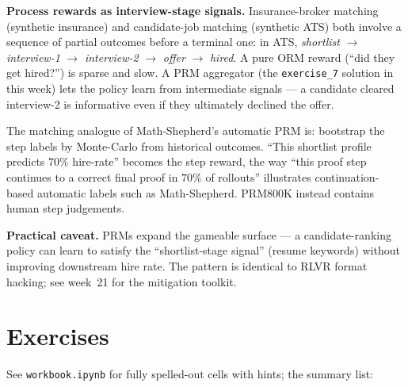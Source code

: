 \documentclass[11pt,oneside]{scrbook}
\begin{document}
\begin{matching}
\textbf{Process rewards as interview-stage signals.}
Insurance-broker matching (synthetic insurance) and candidate-job matching (synthetic ATS)
both involve a sequence of partial outcomes before a terminal one: in ATS,
\textsl{shortlist} $\to$ \textsl{interview-1} $\to$ \textsl{interview-2}
$\to$ \textsl{offer} $\to$ \textsl{hired}. A pure ORM reward (``did they
get hired?'') is sparse and slow. A PRM aggregator (the
\texttt{exercise\_7} solution in this week) lets the policy learn from
intermediate signals --- a candidate cleared interview-2 is informative
even if they ultimately declined the offer.

The matching analogue of Math-Shepherd's automatic PRM is: bootstrap the
step labels by Monte-Carlo from historical outcomes. ``This shortlist
profile predicts $70\%$ hire-rate'' becomes the step reward, the way
``this proof step continues to a correct final proof in $70\%$ of
rollouts'' illustrates continuation-based automatic labels such as Math-Shepherd. PRM800K instead contains human step judgements.

\textbf{Practical caveat.} PRMs expand the gameable surface --- a
candidate-ranking policy can learn to satisfy the
``shortlist-stage signal'' (resume keywords) without improving downstream
hire rate. The pattern is identical to RLVR format hacking; see
week~21 for the mitigation toolkit.
\end{matching}

\chapter{Exercises}

See \texttt{workbook.ipynb} for fully spelled-out cells with hints; the
summary list:
\end{document}
